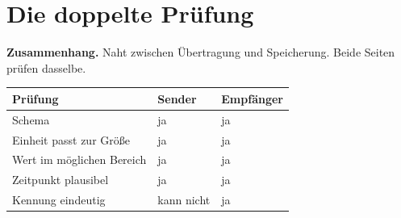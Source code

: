 \chapter{Die doppelte Prüfung}\label{fall:doppelpruefung}

\begin{merksatz}
\textbf{Zusammenhang.} Naht zwischen Übertragung und Speicherung. Beide Seiten prüfen dasselbe.

\begin{center}
{\small
\renewcommand{\arraystretch}{1.45}
\begin{tabular}{@{}P{3.0cm}P{2.2cm}P{2.6cm}@{}}
\toprule
\textbf{Prüfung} & \textbf{Sender} & \textbf{Empfänger}\\
\midrule
Schema & \textcolor{gruen}{ja} & \textcolor{gruen}{ja}\\
Einheit passt zur Größe & \textcolor{gruen}{ja} & \textcolor{gruen}{ja}\\
Wert im möglichen Bereich & \textcolor{gruen}{ja} & \textcolor{gruen}{ja}\\
Zeitpunkt plausibel & \textcolor{gruen}{ja} & \textcolor{gruen}{ja}\\
Kennung eindeutig & \textcolor{akzent}{kann nicht} & \textcolor{gruen}{ja}\\
\bottomrule
\end{tabular}}
\end{center}

\begin{center}
\begin{minipage}{0.88\textwidth}
\end{minipage}
\end{center}
\end{merksatz}

